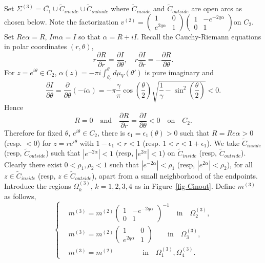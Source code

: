 \documentclass{amsart}
\theoremstyle{definition}
\theoremstyle{remark}
\numberwithin{equation}{section}
\newcommand{\wt}{\widetilde}
\begin{document}
Set $\Sigma^{(3)}=\overline{C_1}\cup \wt{C}_{inside} \cup \wt{C}_{outside}$ 
where $\wt{C}_{inside}$ and $\wt{C}_{outside}$ are open arcs as  chosen below.
Note the factorization $v^{(2)}=
\begin{pmatrix} 1&0\\e^{2q\alpha}&1 \end{pmatrix}
\begin{pmatrix} 1& -e^{-2q\alpha}\\0&1 \end{pmatrix}$on $C_2$. 
Set $Re \alpha =R$, $Im \alpha =I$ so that $\alpha =R+iI$.
Recall the Cauchy-Riemann equations in polar coordinates $(r,\theta)$,
\begin{equation*}
   r\frac{\partial R}{\partial r} =\frac{\partial I}{\partial\theta},
\quad r\frac{\partial I}{\partial r} =-\frac{\partial R}{\partial\theta}. 
\end{equation*}
For $z=e^{i\theta}\in C_2$, 
$\alpha(z)=-\pi i \int_{\theta_c}^{\theta} d\mu_V(\theta')$ 
is pure imaginary and 
\begin{equation*}
\frac{\partial I}{\partial\theta}
=\frac{\partial}{\partial\theta} (-i\alpha)=-\pi\frac{\gamma}{\pi}
\cos(\frac{\theta }{2})
\sqrt{\frac{1}{\gamma} - \sin^2(\frac{\theta}{2})} <0.
\end{equation*}
Hence 
\begin{equation*}
   R=0  \quad\text{and}\quad
   \frac{\partial R}{\partial r} =\frac{\partial I}{\partial\theta} <0
\quad\text{on}\quad C_2. 
\end{equation*}
Therefore for fixed $\theta$, $e^{i\theta}\in C_2$, there is 
$\epsilon_1=\epsilon_1(\theta) >0$ 
such that $R=Re \alpha >0$ (resp. $<0$) for $z=re^{i\theta}$ with 
$1-\epsilon_1 < r< 1$ (resp. $1<r<1+\epsilon_1$).
We take $\wt{C}_{inside}$ (resp, $\wt{C}_{outside}$) 
such that $|e^{-2\alpha}|<1$ (resp, $|e^{2\alpha}|<1$) 
on $\wt{C}_{inside}$ (resp, $\wt{C}_{outside}$).
Clearly there exist $0<\rho_1, \rho_2 <1$ such that $|e^{-2\alpha}|<\rho_1$ 
(resp, $|e^{2\alpha}|<\rho_2$), for all $z\in\wt{C}_{inside}$ 
(resp, $z\in\wt{C}_{outside}$), apart from a small neighborhood 
of the endpoints.
Introduce the regions $\Omega^{(3)}_{k}$, $k=1,2,3,4$ 
as in Figure~\ref{fig-Cinout}.
Define $m^{(3)}$ as follows, 
\begin{equation*}
  \begin{cases}
     &m^{(3)}=m^{(2)} \begin{pmatrix} 1&-e^{-2q\alpha}\\0&1 \end{pmatrix}^{-1}
\quad\text{in}\quad \Omega^{(3)}_2,\\
     &m^{(3)}=m^{(2)} \begin{pmatrix} 1&0\\e^{2q\alpha}&1 \end{pmatrix}
\qquad\text{in}\quad \Omega^{(3)}_3,\\
     &m^{(3)}=m^{(2)} \qquad\qquad\text{in}\quad \Omega^{(3)}_1,\Omega^{(3)}_4.
  \end{cases} 
\end{equation*}
\end{document}

